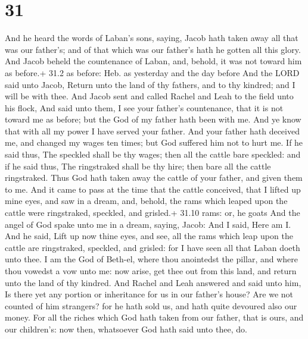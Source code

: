 \hypertarget{section-30}{%
\section{31}\label{section-30}}

 And he heard the words of Laban's sons, saying, Jacob hath
taken away all that was our father's; and of that which was our father's
hath he gotten all this glory.  And Jacob beheld the
countenance of Laban, and, behold, it was not toward him as before.+
31.2 as before: Heb. as yesterday and the day before  And
the LORD said unto Jacob, Return unto the land of thy fathers, and to
thy kindred; and I will be with thee.  And Jacob sent and
called Rachel and Leah to the field unto his flock,  And
said unto them, I see your father's countenance, that it is not toward
me as before; but the God of my father hath been with me. 
And ye know that with all my power I have served your father.
 And your father hath deceived me, and changed my wages ten
times; but God suffered him not to hurt me.  If he said
thus, The speckled shall be thy wages; then all the cattle bare
speckled: and if he said thus, The ringstraked shall be thy hire; then
bare all the cattle ringstraked.  Thus God hath taken away
the cattle of your father, and given them to me.  And it
came to pass at the time that the cattle conceived, that I lifted up
mine eyes, and saw in a dream, and, behold, the rams which leaped upon
the cattle were ringstraked, speckled, and grisled.+ 31.10 rams: or, he
goats  And the angel of God spake unto me in a dream,
saying, Jacob: And I said, Here am I.  And he said, Lift up
now thine eyes, and see, all the rams which leap upon the cattle are
ringstraked, speckled, and grisled: for I have seen all that Laban doeth
unto thee.  I am the God of Beth-el, where thou anointedst
the pillar, and where thou vowedst a vow unto me: now arise, get thee
out from this land, and return unto the land of thy kindred.
 And Rachel and Leah answered and said unto him, Is there
yet any portion or inheritance for us in our father's house?
 Are we not counted of him strangers? for he hath sold us,
and hath quite devoured also our money.  For all the riches
which God hath taken from our father, that is ours, and our children's:
now then, whatsoever God hath said unto thee, do.

